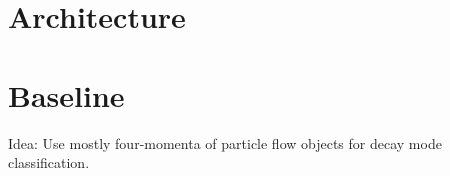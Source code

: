 \section{Architecture}
\label{sec:pfo_architecture}


\section{Baseline}
\label{sec:pfo_baseline}



Idea: Use mostly four-momenta of particle flow objects for decay mode
classification.

